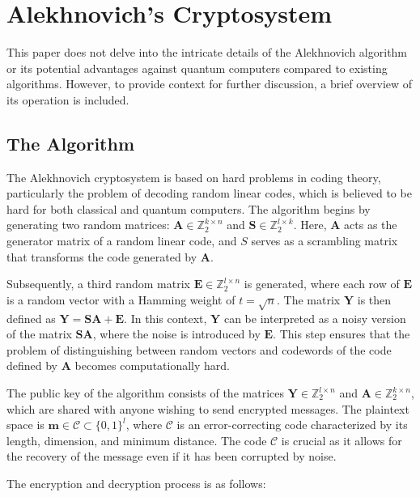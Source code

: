 \chapter{Alekhnovich's Cryptosystem}

This paper does not delve into the intricate details of the Alekhnovich algorithm or its potential advantages against quantum computers compared to existing algorithms. However, to provide context for further discussion, a brief overview of its operation is included.

\section{The Algorithm}
The Alekhnovich cryptosystem\cite{DBLP:journals/cc/Alekhnovich11a} is based on hard problems in coding theory, particularly the problem of decoding random linear codes, which is believed to be hard for both classical and quantum computers. The algorithm begins by generating two random matrices: $\mathbf{A} \in \mathbb{Z}^{k \times n}_2$ and $\mathbf{S} \in \mathbb{Z}^{l \times k}_2$. Here, $\mathbf{A}$ acts as the generator matrix of a random linear code, and $S$ serves as a scrambling matrix that transforms the code generated by $\mathbf{A}$.

Subsequently, a third random matrix $\mathbf{E} \in \mathbb{Z}^{l \times n}_2$ is generated, where each row of $\mathbf{E}$ is a random vector with a Hamming weight of $t = \sqrt{n}$. The matrix $\mathbf{Y}$ is then defined as $\mathbf{Y} = \mathbf{SA} + \mathbf{E}$. In this context, $\mathbf{Y}$ can be interpreted as a noisy version of the matrix $\mathbf{SA}$, where the noise is introduced by $\mathbf{E}$. This step ensures that the problem of distinguishing between random vectors and codewords of the code defined by $\mathbf{A}$ becomes computationally hard.

The public key of the algorithm consists of the matrices $\mathbf{Y} \in \mathbb{Z}^{l \times n}_2$ and $\mathbf{A} \in \mathbb{Z}^{k \times n}_2$, which are shared with anyone wishing to send encrypted messages. The plaintext space is $\mathbf{m} \in \mathcal{C} \subset \{0,1\}^l$, where $\mathcal{C}$ is an error-correcting code characterized by its length, dimension, and minimum distance. The code $\mathcal{C}$ is crucial as it allows for the recovery of the message even if it has been corrupted by noise.

The encryption and decryption process is as follows:

